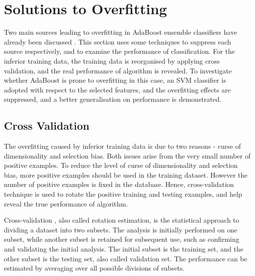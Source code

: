 \section{Solutions to Overfitting}
\label{sec:solutiontooverfitting}
Two main sources leading to overfitting in AdaBoost ensemble classifiers have already been discussed . This section uses some techniques to suppress each source respectively, and to examine the performance of classification. For the inferior training data, the training data is reorganised by applying cross validation, and the real performance of algorithm is revealed. To investigate whether AdaBoost is prone to overfitting in this case, an SVM classifier is adopted with respect to the selected features, and the overfitting effects are suppressed, and a better generalisation on performance is demonstrated.

\subsection{Cross Validation}
The overfitting caused by inferior training data is due to two reasons - curse of dimensionality and selection bias. Both issues arise from the very small number of positive examples. To reduce the level of curse of dimensionality and selection bias, more positive examples should be used in the training dataset. However the number of positive examples is fixed in the database. Hence, cross-validation technique is used to rotate the positive training and testing examples, and help reveal the true performance of algorithm.

Cross-validation \cite{Kohavi1995,Devijver1982}, also called rotation estimation, is the statistical approach to dividing a dataset into two subsets. The analysis is initially performed on one subset, while another subset is retained for subsequent use, such as confirming and validating the initial analysis. The initial subset is the training set, and the other subset is the testing set, also called validation set. The performance can be estimated by averaging over all possible divisions of subsets.

